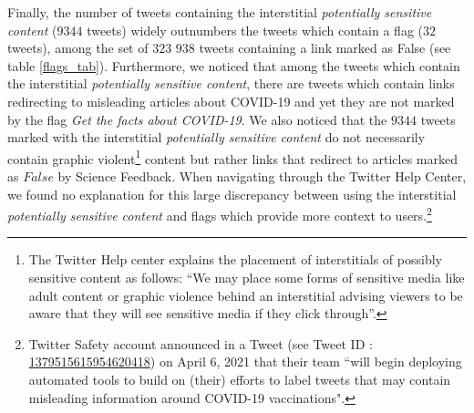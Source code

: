\documentclass{article}
\begin{document}
Finally, the number of tweets containing the interstitial {\it potentially sensitive content} ($9344$ tweets) widely outnumbers the tweets which contain a flag ($32$ tweets), among the set of $323$ $938$ tweets containing a link marked as False (see table \ref{flags_tab}). Furthermore, we noticed that among the tweets which contain the interstitial {\it potentially sensitive content}, there are tweets which contain links redirecting to misleading articles about COVID-19 and yet they are not marked by the flag { \it Get the facts about COVID-19}. We also noticed that the $9344$ tweets marked with the interstitial {\it potentially sensitive content} do not necessarily contain graphic violent\footnote{The Twitter Help center explains the placement of interstitials of possibly sensitive content as follows: ``We may place some forms of sensitive media like adult content or graphic violence behind an interstitial advising viewers to be aware that they will see sensitive media if they click through''.} content but rather links that redirect to articles marked as $False$ by Science Feedback. When navigating through the Twitter Help Center, we found no explanation for this large discrepancy between using the interstitial {\it potentially sensitive content} and flags which provide more context to users.\footnote{Twitter Safety account announced in a Tweet (see Tweet ID : \href{https://twitter.com/TwitterSafety/status/1379515615954620418}{1379515615954620418}) on April 6, 2021 that their team ``will begin deploying automated tools to build on (their) efforts to label tweets that may contain misleading information around COVID-19 vaccinations".}  
\end{document}
